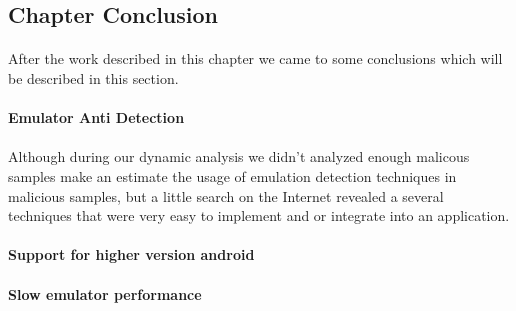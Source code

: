 \documentclass[../main.tex]{subfile}
\begin{document}
		\subsection{Chapter Conclusion}
		\paragraph{} After the work described in this chapter we came to some conclusions which will be described in this section.
		\paragraph{Emulator Anti Detection} 
		\paragraph{} Although during our dynamic analysis we didn't analyzed enough malicous samples make an estimate the usage of emulation detection techniques in malicious samples, but a little search on the Internet revealed a several techniques that were very easy to implement and or integrate into an application.
		\paragraph{Support for higher version android}
		\paragraph{Slow emulator performance}
		
\end{document}
